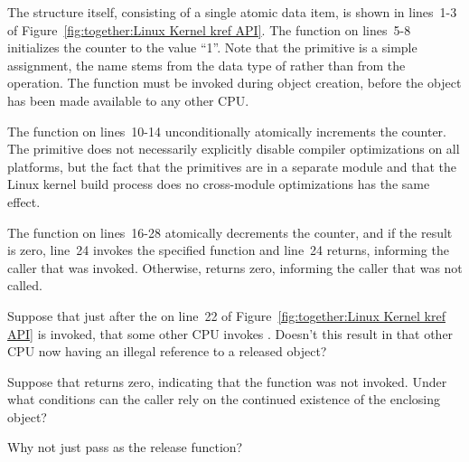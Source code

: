 The  structure itself, consisting of a single atomic
data item, is shown in lines~1-3 of
Figure~\ref{fig:together:Linux Kernel kref API}.
The  function on lines~5-8 initializes the counter
to the value ``1''.
Note that the  primitive is a simple
assignment, the name stems from the data type of 
rather than from the operation.
The  function must be invoked during object creation,
before the object has been made available to any other CPU.

The  function on lines~10-14 unconditionally atomically
increments the counter.
The  primitive does not necessarily explicitly
disable compiler
optimizations on all platforms, but the fact that the 
primitives are in a separate module and that the Linux kernel build
process does no cross-module optimizations has the same effect.

The  function on lines~16-28 atomically decrements the
counter, and if the result is zero, line~24 invokes the specified
 function and line~24 returns, informing the caller
that  was invoked.
Otherwise,  returns zero, informing the caller that
 was not called.

\QuickQuiz{}
	Suppose that just after the 
	on line~22 of
	Figure~\ref{fig:together:Linux Kernel kref API} is invoked,
	that some other CPU invokes .
	Doesn't this result in that other CPU now having an illegal
	reference to a released object?
 \QuickQuizEnd

\QuickQuiz{}
	Suppose that  returns zero, indicating that
	the  function was not invoked.
	Under what conditions can the caller rely on the continued
	existence of the enclosing object?
 \QuickQuizEnd

\QuickQuiz{}
	Why not just pass  as the release function?
 \QuickQuizEnd

